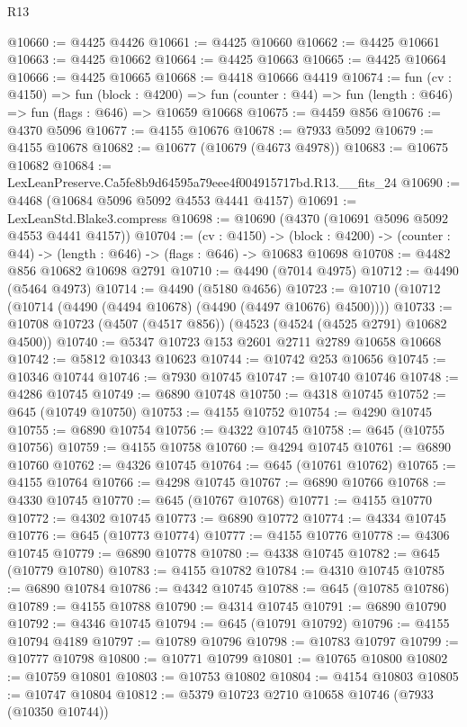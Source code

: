 \begin{lexlean}{R13}
\begin{coremodule}
@10660 := @4425 @4426
@10661 := @4425 @10660
@10662 := @4425 @10661
@10663 := @4425 @10662
@10664 := @4425 @10663
@10665 := @4425 @10664
@10666 := @4425 @10665
@10668 := @4418 @10666 @4419
@10674 := fun (cv : @4150) =>
  fun (block : @4200) =>
  fun (counter : @44) => fun (length : @646) => fun (flags : @646) => @10659 @10668
@10675 := @4459 @856
@10676 := @4370 @5096
@10677 := @4155 @10676
@10678 := @7933 @5092
@10679 := @4155 @10678
@10682 := @10677 (@10679 (@4673 @4978))
@10683 := @10675 @10682
@10684 := LexLeanPreserve.Ca5fe8b9d64595a79eee4f004915717bd.R13.__fits_24
@10690 := @4468 (@10684 @5096 @5092 @4553 @4441 @4157)
@10691 := LexLeanStd.Blake3.compress
@10698 := @10690 (@4370 (@10691 @5096 @5092 @4553 @4441 @4157))
@10704 := (cv : @4150) ->
  (block : @4200) -> (counter : @44) -> (length : @646) -> (flags : @646) -> @10683 @10698
@10708 := @4482 @856 @10682 @10698 @2791
@10710 := @4490 (@7014 @4975)
@10712 := @4490 (@5464 @4973)
@10714 := @4490 (@5180 @4656)
@10723 := @10710 (@10712 (@10714 (@4490 (@4494 @10678) (@4490 (@4497 @10676) @4500))))
@10733 := @10708 @10723 (@4507 (@4517 @856)) (@4523 (@4524 (@4525 @2791) @10682 @4500))
@10740 := @5347 @10723 @153 @2601 @2711 @2789 @10658 @10668
@10742 := @5812 @10343 @10623
@10744 := @10742 @253 @10656
@10745 := @10346 @10744
@10746 := @7930 @10745
@10747 := @10740 @10746
@10748 := @4286 @10745
@10749 := @6890 @10748
@10750 := @4318 @10745
@10752 := @645 (@10749 @10750)
@10753 := @4155 @10752
@10754 := @4290 @10745
@10755 := @6890 @10754
@10756 := @4322 @10745
@10758 := @645 (@10755 @10756)
@10759 := @4155 @10758
@10760 := @4294 @10745
@10761 := @6890 @10760
@10762 := @4326 @10745
@10764 := @645 (@10761 @10762)
@10765 := @4155 @10764
@10766 := @4298 @10745
@10767 := @6890 @10766
@10768 := @4330 @10745
@10770 := @645 (@10767 @10768)
@10771 := @4155 @10770
@10772 := @4302 @10745
@10773 := @6890 @10772
@10774 := @4334 @10745
@10776 := @645 (@10773 @10774)
@10777 := @4155 @10776
@10778 := @4306 @10745
@10779 := @6890 @10778
@10780 := @4338 @10745
@10782 := @645 (@10779 @10780)
@10783 := @4155 @10782
@10784 := @4310 @10745
@10785 := @6890 @10784
@10786 := @4342 @10745
@10788 := @645 (@10785 @10786)
@10789 := @4155 @10788
@10790 := @4314 @10745
@10791 := @6890 @10790
@10792 := @4346 @10745
@10794 := @645 (@10791 @10792)
@10796 := @4155 @10794 @4189
@10797 := @10789 @10796
@10798 := @10783 @10797
@10799 := @10777 @10798
@10800 := @10771 @10799
@10801 := @10765 @10800
@10802 := @10759 @10801
@10803 := @10753 @10802
@10804 := @4154 @10803
@10805 := @10747 @10804
@10812 := @5379 @10723 @2710 @10658 @10746 (@7933 (@10350 @10744))

\end{coremodule}
\end{lexlean}
